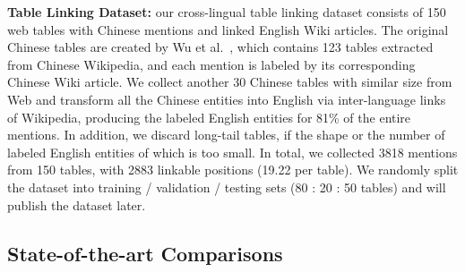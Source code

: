 \noindent
\textbf{Table Linking Dataset:}
our cross-lingual table linking dataset consists of 150 web tables with
Chinese mentions and linked English Wiki articles.
The original Chinese tables are created by Wu et al.~,
which contains 123 tables extracted from Chinese Wikipedia, and each mention is labeled by
its corresponding Chinese Wiki article.
We collect another 30 Chinese tables with similar size from Web and
transform all the Chinese entities into English via inter-language links of Wikipedia,
producing the labeled English entities for 81\% of the entire mentions.
In addition, we discard long-tail tables,
if the shape or the number of labeled English entities of which is too small.
In total, we collected 3818 mentions from 150 tables, with 2883 linkable positions
(19.22 per table).
We randomly split the dataset into training / validation / testing sets (80 : 20 : 50 tables) 
and will publish the dataset later.




\subsection{State-of-the-art Comparisons}
\label{exp:soat}

